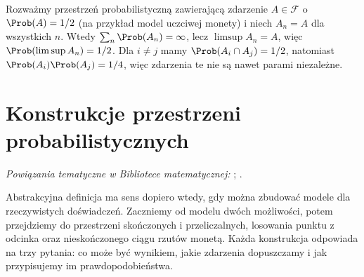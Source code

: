 \begin{przyklad}
Rozważmy przestrzeń probabilistyczną zawierającą zdarzenie
$A\in\mathcal F$ o $\Prob(A)=1/2$ (na przykład model uczciwej monety)
i niech $A_n=A$
dla wszystkich $n$. Wtedy $\sum_n\Prob(A_n)=\infty$,
lecz $\limsup A_n=A$, więc $\Prob(\limsup A_n)=1/2$.
Dla $i\ne j$ mamy $\Prob(A_i\cap A_j)=1/2$,
natomiast $\Prob(A_i)\Prob(A_j)=1/4$, więc zdarzenia
te nie są nawet parami niezależne.
\end{przyklad}

\section{Konstrukcje przestrzeni probabilistycznych}

\noindent\emph{Powiązania tematyczne w Bibliotece matematycznej:} ; .

Abstrakcyjna definicja ma sens dopiero wtedy, gdy można zbudować
modele dla rzeczywistych doświadczeń. Zaczniemy od modelu dwóch
możliwości, potem przejdziemy do przestrzeni skończonych i
przeliczalnych, losowania punktu z odcinka oraz nieskończonego
ciągu rzutów monetą. Każda konstrukcja odpowiada na trzy pytania:
co może być wynikiem, jakie zdarzenia dopuszczamy i jak przypisujemy
im prawdopodobieństwa.


